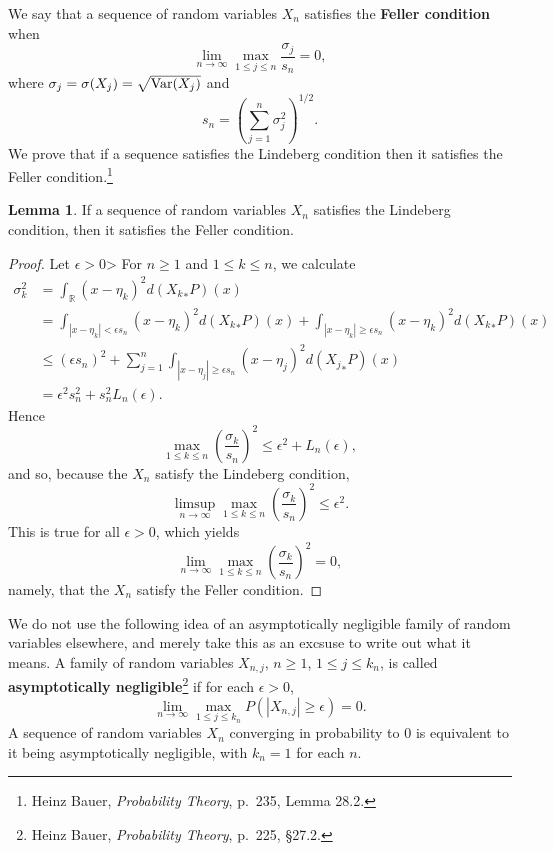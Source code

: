 \documentclass{article}
\newcommand{\Var}{\ensuremath\mathrm{Var}}
\theoremstyle{definition}
\newtheorem{lemma}[theorem]{Lemma}
\theoremstyle{definition}
\begin{document}
We say that a sequence of random variables $X_n$ satisfies the
\textbf{Feller condition} when
\[
\lim_{n \to \infty} \max_{1 \leq j \leq n} \frac{\sigma_j}{s_n}=0,
\]
where $\sigma_j=\sigma(X_j)=\sqrt{\Var(X_j)}$ and 
\[
s_n = \left(\sum_{j=1}^n \sigma_j^2 \right)^{1/2}.
\]
We prove that if a sequence satisfies the Lindeberg condition then it satisfies the Feller condition.\footnote{Heinz
Bauer, {\em Probability Theory}, p.~235, Lemma 28.2.}

\begin{lemma}
If a sequence of random variables $X_n$ satisfies the Lindeberg condition, then it satisfies the Feller condition.
\label{feller}
\end{lemma}
\begin{proof}
Let $\epsilon>0$>
For $n \geq 1$ and $1 \leq k \leq n$, we calculate
\begin{align*}
\sigma_k^2&=\int_\mathbb{R} (x-\eta_k)^2 d({X_k}_*P)(x)\\
&= \int_{|x-\eta_k|<\epsilon s_n} (x-\eta_k)^2 d({X_k}_*P)(x)
+\int_{|x-\eta_k|\geq \epsilon s_n} (x-\eta_k)^2 d({X_k}_*P)(x)\\
&\leq (\epsilon s_n)^2 +\sum_{j=1}^n \int_{|x-\eta_j|\geq \epsilon s_n} (x-\eta_j)^2 d({X_j}_*P)(x)\\
&= \epsilon^2 s_n^2 + s_n^2 L_n(\epsilon).
\end{align*}
Hence
\[
\max_{1 \leq k \leq n} \left( \frac{\sigma_k}{s_n} \right)^2 \leq \epsilon^2 + L_n(\epsilon),
\]
and so, because the $X_n$ satisfy the Lindeberg condition, 
\[
\limsup_{n \to \infty} \max_{1 \leq k \leq n}  \left( \frac{\sigma_k}{s_n} \right)^2
\leq \epsilon^2.
\]
This is true for all $\epsilon>0$, which yields
\[
\lim_{n \to \infty} \max_{1 \leq k \leq n}  \left( \frac{\sigma_k}{s_n} \right)^2 = 0,
\]
namely, that the $X_n$ satisfy the Feller condition.
\end{proof}



We do not use the following idea of an asymptotically negligible 
family of random variables elsewhere, and merely take this as an excsuse to write out what it means.
A family of random variables $X_{n,j}$, $n \geq 1$, $1 \leq j \leq k_n$, is called
\textbf{asymptotically negligible}\footnote{Heinz Bauer,
{\em Probability Theory}, p.~225, \S 27.2.}
if for each $\epsilon>0$,
\[
\lim_{n \to \infty} \max_{1 \leq j \leq k_n} P(|X_{n,j}| \geq \epsilon) =0.
\]
A sequence of random variables $X_n$ converging in probability to $0$ is equivalent to
it being asymptotically negligible, with $k_n=1$ for each $n$. 
\end{document}
